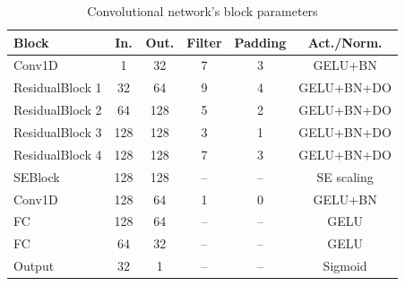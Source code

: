 \documentclass[journal]{IEEEtran}
\begin{document}

\begin{table}[ht]
\centering
\caption{Convolutional network's block parameters}
\label{tab:ppg_layers}
\begin{tabular}{|l|c|c|c|c|c|}
\hline
\textbf{Block} & \textbf{In.} & \textbf{Out.} & \textbf{Filter} & \textbf{Padding} & \textbf{Act./Norm.} \\
\hline
Conv1D & 1 & 32 & 7 & 3 & GELU+BN \\
ResidualBlock 1 & 32 & 64 & 9 & 4 & GELU+BN+DO \\
ResidualBlock 2 & 64 & 128 & 5 & 2 & GELU+BN+DO \\
ResidualBlock 3 & 128 & 128 & 3 & 1 & GELU+BN+DO\\
ResidualBlock 4 & 128 & 128 & 7 & 3 & GELU+BN+DO \\
SEBlock & 128 & 128 & – & – & SE scaling \\
Conv1D  & 128 & 64 & 1 & 0 & GELU+BN \\
FC & 128 & 64 & – & – & GELU \\
FC & 64 & 32 & – & – & GELU \\
Output & 32 & 1 & – & – & Sigmoid \\
\hline
\end{tabular}
\end{table}
\end{document}

